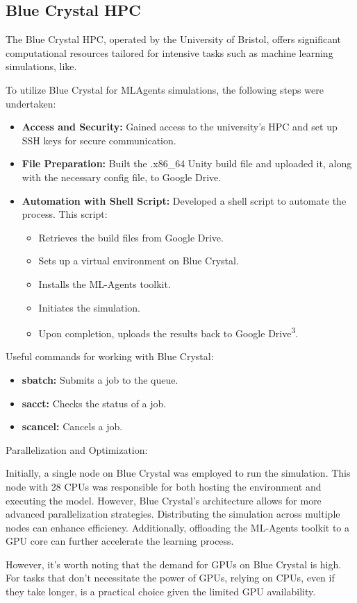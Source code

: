 \subsection{Blue Crystal HPC}

The Blue Crystal HPC, operated by the University of Bristol, offers significant computational resources tailored for intensive tasks such as machine learning simulations, like.


To utilize Blue Crystal for MLAgents simulations, the following steps were undertaken:

\begin{itemize}
    \item \textbf{Access and Security:} Gained access to the university's HPC and set up SSH keys for secure communication.
    \item \textbf{File Preparation:} Built the .x86\_64 Unity build file and uploaded it, along with the necessary config file, to Google Drive.
    \item \textbf{Automation with Shell Script:} Developed a shell script to automate the process. This script:
    \begin{itemize}
        \item Retrieves the build files from Google Drive.
        \item Sets up a virtual environment on Blue Crystal.
        \item Installs the ML-Agents toolkit.
        \item Initiates the simulation.
        \item Upon completion, uploads the results back to Google Drive\textsuperscript{3}.
    \end{itemize}
\end{itemize}

Useful commands for working with Blue Crystal:

\begin{itemize}
    \item \textbf{sbatch:} Submits a job to the queue.
    \item \textbf{sacct:} Checks the status of a job.
    \item \textbf{scancel:} Cancels a job.
\end{itemize}

Parallelization and Optimization:

Initially, a single node on Blue Crystal was employed to run the simulation. This node with 28 CPUs was responsible for both hosting the environment and executing the model. However, Blue Crystal's architecture allows for more advanced parallelization strategies. Distributing the simulation across multiple nodes can enhance efficiency. Additionally, offloading the ML-Agents toolkit to a GPU core can further accelerate the learning process.

However, it's worth noting that the demand for GPUs on Blue Crystal is high. For tasks that don't necessitate the power of GPUs, relying on CPUs, even if they take longer, is a practical choice given the limited GPU availability.





